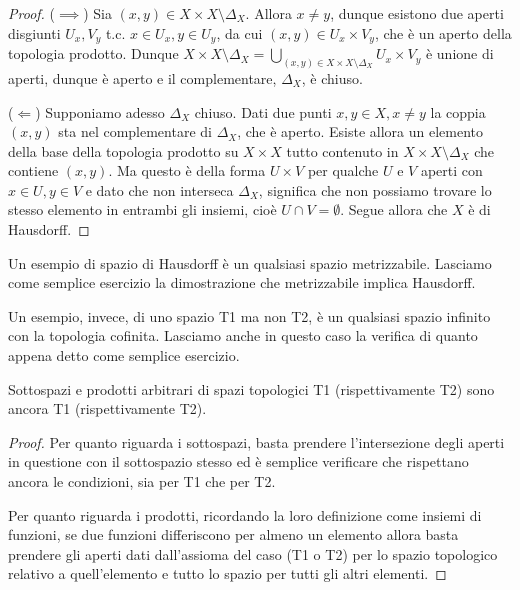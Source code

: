 \begin{proof}
  ($\implies$) Sia $(x, y) \in X \times X \setminus \Delta_X$. Allora $x \not= y$, dunque esistono due aperti disgiunti $U_x, V_y$ t.c. $x \in U_x, y \in U_y$, da cui $(x, y) \in U_x \times V_y$, che è un aperto della topologia prodotto. Dunque $\displaystyle X \times X \setminus \Delta_X=\bigcup_{(x, y) \in X \times X \setminus \Delta_X} U_x \times V_y$ è unione di aperti, dunque è aperto e il complementare, $\Delta_X$, è chiuso.

  ($\Leftarrow$) Supponiamo adesso $\Delta_X$ chiuso. Dati due punti $x, y \in X, x \not= y$ la coppia $(x, y)$ sta nel complementare di $\Delta_X$, che è aperto. Esiste allora un elemento della base della topologia prodotto su $X \times X$ tutto contenuto in $X \times X \setminus \Delta_X$ che contiene $(x, y)$. Ma questo è della forma $U \times V$ per qualche $U$ e $V$ aperti con $x \in U, y \in V$ e dato che non interseca $\Delta_X$, significa che non possiamo trovare lo stesso elemento in entrambi gli insiemi, cioè $U \cap V= \emptyset$. Segue allora che $X$ è di Hausdorff.
\end{proof}

\begin{ex} \label{metrizz->T2}
  Un esempio di spazio di Hausdorff è un qualsiasi spazio metrizzabile. Lasciamo come semplice esercizio la dimostrazione che metrizzabile implica Hausdorff.

  Un esempio, invece, di uno spazio T1 ma non T2, è un qualsiasi spazio infinito con la topologia cofinita. Lasciamo anche in questo caso la verifica di quanto appena detto come semplice esercizio.
\end{ex}

\begin{prop}
  Sottospazi e prodotti arbitrari di spazi topologici T1 (rispettivamente T2) sono ancora T1 (rispettivamente T2).
\end{prop}

\begin{proof}
  Per quanto riguarda i sottospazi, basta prendere l'intersezione degli aperti in questione con il sottospazio stesso ed è semplice verificare che rispettano ancora le condizioni, sia per T1 che per T2.

  Per quanto riguarda i prodotti, ricordando la loro definizione come insiemi di funzioni, se due funzioni differiscono per almeno un elemento allora basta prendere gli aperti dati dall'assioma del caso (T1 o T2) per lo spazio topologico relativo a quell'elemento e tutto lo spazio per tutti gli altri elementi.
\end{proof}

